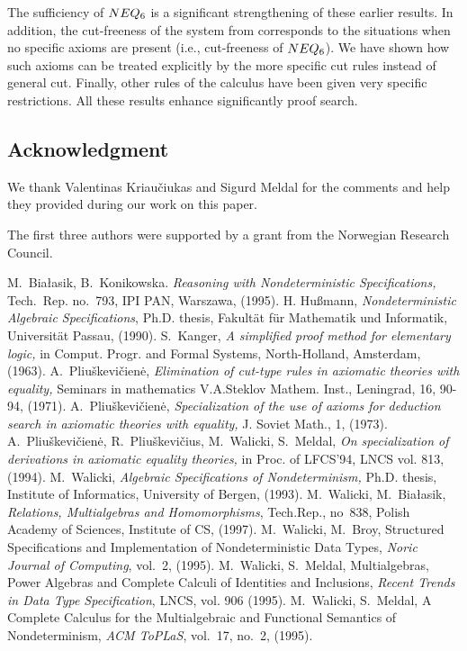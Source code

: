 \documentclass[10pt]{article}
\begin{document}
The sufficiency of $NEQ_6$ is a significant strengthening of these earlier results.
In addition, the cut-freeness of the system from \cite{BK95} corresponds to the 
situations when
no specific axioms are present (i.e., cut-freeness of $NEQ_6$). 
We have shown how such axioms can be treated explicitly by
the more specific cut rules instead of general cut. Finally, other rules of the 
calculus have
been given very specific restrictions. All these results enhance significantly 
proof search.

\subsection*{Acknowledgment}
We thank Valentinas Kriau\v ciukas and Sigurd
Meldal for the comments and help they provided during our work on this paper.

The first three authors were supported by a grant from the Norwegian Research Council.

\begin{thebibliography}{MM99}\MyLPar
{} M.~Bia{\l}asik, B.~Konikowska. 
   {\em Reasoning with Nondeterministic Specifications,} Tech.~Rep. no.~793, IPI PAN, Warszawa,
   (1995).
 H. Hu{\ss}mann, {\em Nondeterministic Algebraic Specifications},
Ph.D. thesis, Fakult\"{a}t f\"{u}r Mathematik und Informatik, Universit\"{a}t Passau, 
 (1990).
 S.~Kanger,
   {\em A simplified proof method for elementary logic,}
   in Comput. Progr. and Formal Systems, North-Holland, Amsterdam, (1963).
 A.~Pliu\v skevi\v cien\.e, 
   {\em Elimination of cut-type rules in axiomatic theories with equality,}
   Seminars in mathematics V.A.Steklov Mathem. Inst., Leningrad, 16, 90-94, (1971).
 A.~Pliu\v skevi\v cien\.e,
   {\em Specialization of the use of axioms for deduction search in 
   axiomatic theories with equality,}
   J. Soviet Math., 1, (1973).
 A.~Pliu\v skevi\v cien\.e, R.~Pliu\v skevi\v cius,
   M.~Walicki, S.~Meldal,
   {\em On specialization of derivations in axiomatic equality theories,}
   in Proc. of LFCS'94, LNCS vol. 813, (1994).
 M.~Walicki,
   {\em Algebraic Specifications of Nondeterminism,}
   Ph.D. thesis, Institute of Informatics, University of Bergen, (1993).
 M.~Walicki, M.~Bia{\l}asik, {\em Relations, Multialgebras and 
   Homomorphisms}, Tech.Rep., no~838, Polish Academy of Sciences, Institute of
  CS, (1997).
 M.~Walicki, M.~Broy, Structured Specifications and Implementation of
   Nondeterministic Data Types, {\em Noric Journal of Computing}, vol.~2, (1995).
 M.~Walicki, S.~Meldal, 
   Multialgebras, Power Algebras and Complete Calculi of Identities and 
       Inclusions, {\em Recent Trends in Data Type  Specification}, LNCS, vol. 906 (1995).
 M.~Walicki, S.~Meldal, 
   A Complete Calculus for the Multialgebraic and Functional Semantics of Nondeterminism,  
       {\em ACM ToPLaS}, vol.~17, no.~2, (1995).
\end{thebibliography} 
\end{document}
